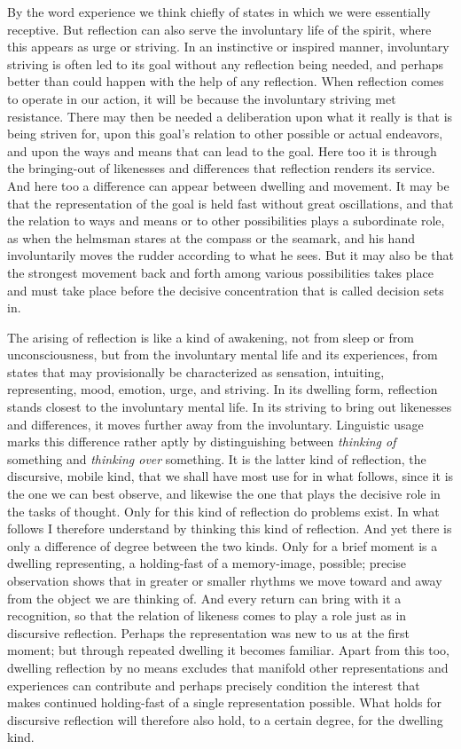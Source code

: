 \documentclass[12pt,a4paper]{book}
\newcommand{\opage}[1]{\marginnote{\footnotesize\textit{[#1]}}}
\begin{document}
By the word experience we think chiefly of states in which we were
essentially receptive. But reflection can also serve the involuntary
life of the spirit, where this appears as urge or striving. In an
instinctive or inspired manner, involuntary striving is often led to its
goal without any reflection being needed, and perhaps better than could
happen with the help of any reflection. When reflection comes to operate
in our action, it will be because the involuntary striving met
resistance. There may then be needed a deliberation upon what it really
is that is being striven for, upon this goal's relation to other
possible or actual endeavors, and upon the ways and means that can lead
to the goal. Here too it is through the bringing-out of likenesses and
differences that reflection renders its service. And here too a
difference can appear between dwelling and movement. It may be that the
representation of the goal is held fast without great oscillations, and
that the relation to ways and means or to other possibilities plays a
subordinate role, as when the helmsman stares at the compass or the
seamark, and his hand involuntarily moves the rudder according to what
he sees. But it may also be that the strongest movement back and forth
among various possibilities takes place and must take place before the
decisive concentration that is called decision sets in.

\opage{3}The arising of reflection is like a kind of awakening, not from sleep or
from unconsciousness, but from the involuntary mental life and its
experiences, from states that may provisionally be characterized as
sensation, intuiting, representing, mood, emotion, urge, and striving.
In its dwelling form, reflection stands closest to the involuntary
mental life. In its striving to bring out likenesses and differences, it
moves further away from the involuntary. Linguistic usage marks this
difference rather aptly by distinguishing between \emph{thinking of}
something and \emph{thinking over} something. It is the latter kind of
reflection, the discursive, mobile kind, that we shall have most use for
in what follows, since it is the one we can best observe, and likewise
the one that plays the decisive role in the tasks of thought. Only for
this kind of reflection do problems exist. In what follows I therefore
understand by thinking this kind of reflection. And yet there is only a
difference of degree between the two kinds. Only for a brief moment is a
dwelling representing, a holding-fast of a memory-image, possible;
precise observation shows that in greater or smaller rhythms we move
toward and away from the object we are thinking of. And every return can
bring with it a recognition, so that the relation of likeness comes to
play a role just as in discursive reflection. Perhaps the representation
was new to us at the first moment; but through repeated dwelling it
becomes familiar. Apart from this too, dwelling reflection by no means
excludes that manifold other representations and experiences can
contribute and perhaps precisely condition the interest that makes
continued holding-fast of a single representation possible. What holds
for discursive reflection will therefore also hold, to a certain degree,
for the dwelling kind.
\end{document}

